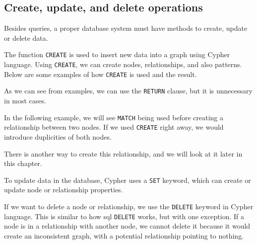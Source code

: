 \subsection{Create, update, and delete operations}

Besides queries, a proper database system must have methods to create, update or delete data.

The function \texttt{CREATE} is used to insert new data into a graph using Cypher language.
Using \texttt{CREATE}, we can create nodes, relationships, and also patterns. Below are some examples of how \texttt{CREATE} is used and the result. \cite{noauthor_updating_nodate}


As we can see from examples, we can use the \texttt{RETURN} clause, but it is unnecessary in most cases.

In the following example, we will see \texttt{MATCH} being used before creating a relationship between two nodes.
If we used \texttt{CREATE} right away, we would introduce duplicities of both nodes.


There is another way to create this relationship, and we will look at it later in this chapter.

To update data in the database, Cypher uses a \texttt{SET} keyword, which can create or update node or relationship properties.

If we want to delete a node or relationship, we use the \texttt{DELETE} keyword in Cypher language.
This is similar to how \acrshort{sql} \texttt{DELETE} works, but with one exception. If a node is in a relationship
with another node, we cannot delete it because it would create an inconsistent graph, with a potential relationship pointing to nothing. \cite{noauthor_updating_nodate}

